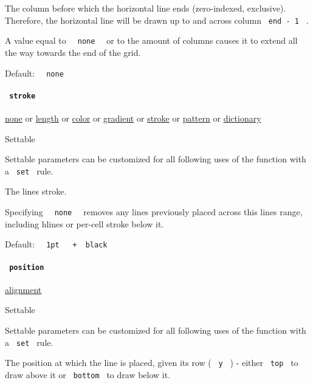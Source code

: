 The column before which the horizontal line ends (zero-indexed,
exclusive). Therefore, the horizontal line will be drawn up to and
across column \texttt{\ end\ -\ 1\ } .

A value equal to \texttt{\ }{\texttt{\ none\ }}\texttt{\ } or to the
amount of columns causes it to extend all the way towards the end of the
grid.

Default: \texttt{\ }{\texttt{\ none\ }}\texttt{\ }

\paragraph{\texorpdfstring{\texttt{\ stroke\ }}{ stroke }}\label{definitions-hline-stroke}

\href{/docs/reference/foundations/none/}{none} {or}
\href{/docs/reference/layout/length/}{length} {or}
\href{/docs/reference/visualize/color/}{color} {or}
\href{/docs/reference/visualize/gradient/}{gradient} {or}
\href{/docs/reference/visualize/stroke/}{stroke} {or}
\href{/docs/reference/visualize/pattern/}{pattern} {or}
\href{/docs/reference/foundations/dictionary/}{dictionary}

{{ Settable }}

\label{definitions-hline-stroke-settable-tooltip}
Settable parameters can be customized for all following uses of the
function with a \texttt{\ set\ } rule.

The line\textquotesingle s stroke.

Specifying \texttt{\ }{\texttt{\ none\ }}\texttt{\ } removes any lines
previously placed across this line\textquotesingle s range, including
hlines or per-cell stroke below it.

Default:
\texttt{\ }{\texttt{\ 1pt\ }}\texttt{\ }{\texttt{\ +\ }}\texttt{\ black\ }

\paragraph{\texorpdfstring{\texttt{\ position\ }}{ position }}\label{definitions-hline-position}

\href{/docs/reference/layout/alignment/}{alignment}

{{ Settable }}

\label{definitions-hline-position-settable-tooltip}
Settable parameters can be customized for all following uses of the
function with a \texttt{\ set\ } rule.

The position at which the line is placed, given its row ( \texttt{\ y\ }
) - either \texttt{\ top\ } to draw above it or \texttt{\ bottom\ } to
draw below it.

